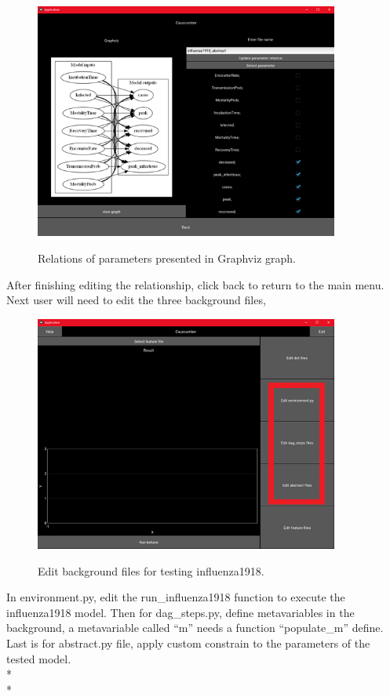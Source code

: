 \begin{figure}[H]
	\centering
	\includegraphics[width=10cm]{figures/influenzaTestProcess7.png}\\
	\caption{Relations of parameters presented in Graphviz graph.}
	\label{fig:figure25}
\end{figure}
After finishing editing the relationship, click back to return to the main menu.
Next user will need to edit the three background files, 
\begin{figure}[H]
	\centering
	\includegraphics[width=10cm]{figures/influenzaTestProcess8.png}\\
	\caption{Edit background files for testing influenza1918.}
	\label{fig:figure26}
\end{figure}
In environment.py, edit the run\_influenza1918 function to execute the influenza1918 model. Then for dag\_steps.py, define metavariables in the background, a metavariable called “m” needs a function “populate\_m” define. Last is for abstract.py file, apply custom constrain to the parameters of the tested model. \\*\\*
